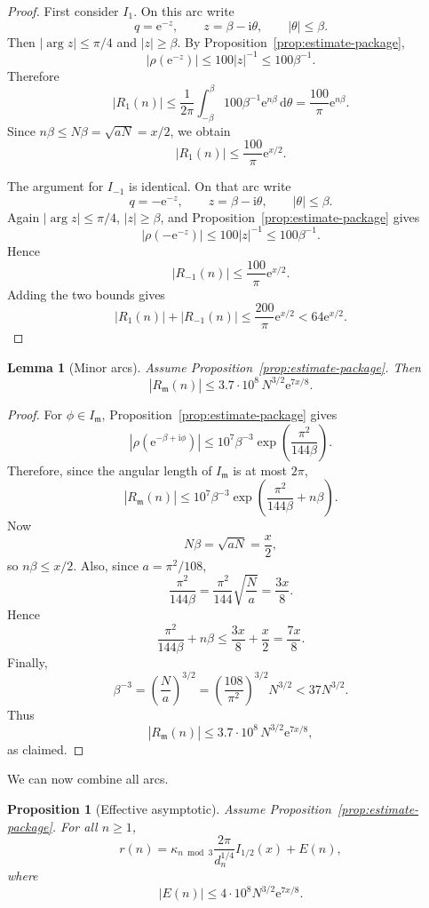 \documentclass[11pt]{article}
\newtheorem{proposition}[theorem]{Proposition}
\newtheorem{lemma}[theorem]{Lemma}
\theoremstyle{remark}
\newcommand{\ii}{\mathrm i}
\newcommand{\e}{\mathrm e}
\newcommand{\dd}{\mathrm d}
\newcommand{\mm}{\mathfrak m}
\begin{document}
\begin{proof}
First consider $I_1$.  On this arc write
\[
q=\e^{-z},
\qquad
z=\beta-\ii\theta,
\qquad
|\theta|\leq\beta.
\]
Then $|\arg z|\leq\pi/4$ and $|z|\geq\beta$.  By
Proposition~\ref{prop:estimate-package},
\[
|\rho(\e^{-z})|\leq100|z|^{-1}\leq100\beta^{-1}.
\]
Therefore
\[
|R_1(n)|
\leq
\frac1{2\pi}
\int_{-\beta}^{\beta}
100\beta^{-1}\e^{n\beta}\,\dd\theta
=
\frac{100}{\pi}\e^{n\beta}.
\]
Since $n\beta\leq N\beta=\sqrt{aN}=x/2$, we obtain
\[
|R_1(n)|\leq\frac{100}{\pi}\e^{x/2}.
\]

The argument for $I_{-1}$ is identical.  On that arc write
\[
q=-\e^{-z},
\qquad
z=\beta-\ii\theta,
\qquad
|\theta|\leq\beta.
\]
Again $|\arg z|\leq\pi/4$, $|z|\geq\beta$, and
Proposition~\ref{prop:estimate-package} gives
\[
|\rho(-\e^{-z})|\leq100|z|^{-1}\leq100\beta^{-1}.
\]
Hence
\[
|R_{-1}(n)|\leq\frac{100}{\pi}\e^{x/2}.
\]
Adding the two bounds gives
\[
|R_1(n)|+|R_{-1}(n)|
\leq
\frac{200}{\pi}\e^{x/2}
<64\e^{x/2}.
\]
\end{proof}

\begin{lemma}[Minor arcs]\label{lem:minor-arcs}
Assume Proposition~\ref{prop:estimate-package}.  Then
\begin{equation}\label{eq:minor-bound}
|R_{\mm}(n)|
\leq
3.7\cdot10^8\,N^{3/2}\e^{7x/8}.
\end{equation}
\end{lemma}

\begin{proof}
For $\phi\in I_{\mm}$, Proposition~\ref{prop:estimate-package} gives
\[
|\rho(\e^{-\beta+\ii\phi})|
\leq
10^7\beta^{-3}
\exp\left(\frac{\pi^2}{144\beta}\right).
\]
Therefore, since the angular length of $I_{\mm}$ is at most $2\pi$,
\[
|R_{\mm}(n)|
\leq
10^7\beta^{-3}
\exp\left(\frac{\pi^2}{144\beta}+n\beta\right).
\]
Now
\[
N\beta=\sqrt{aN}=\frac{x}{2},
\]
so $n\beta\leq x/2$.  Also, since $a=\pi^2/108$,
\[
\frac{\pi^2}{144\beta}
=
\frac{\pi^2}{144}\sqrt{\frac{N}{a}}
=
\frac{3x}{8}.
\]
Hence
\[
\frac{\pi^2}{144\beta}+n\beta
\leq
\frac{3x}{8}+\frac{x}{2}
=
\frac{7x}{8}.
\]
Finally,
\[
\beta^{-3}
=
\left(\frac{N}{a}\right)^{3/2}
=
\left(\frac{108}{\pi^2}\right)^{3/2}N^{3/2}
<37N^{3/2}.
\]
Thus
\[
|R_{\mm}(n)|
\leq
3.7\cdot10^8\,N^{3/2}\e^{7x/8},
\]
as claimed.
\end{proof}

We can now combine all arcs.

\begin{proposition}[Effective asymptotic]\label{prop:effective-asymp}
Assume Proposition~\ref{prop:estimate-package}.  For all $n\geq1$,
\begin{equation}\label{eq:effective-asymp}
r(n)
=
\kappa_{n\bmod3}\frac{2\pi}{d_n^{1/4}}I_{1/2}(x)
+
E(n),
\end{equation}
where
\begin{equation}\label{eq:global-error}
|E(n)|\leq4\cdot10^8N^{3/2}\e^{7x/8}.
\end{equation}
\end{proposition}
\end{document}
